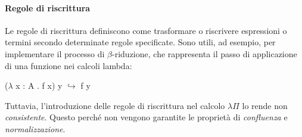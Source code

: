 \documentclass[12pt,a4paper]{mimosis}
\begin{document}
\begin{prooftree}
\end{prooftree}

\begin{prooftree}
\end{prooftree}

\begin{prooftree}
\end{prooftree}

\begin{prooftree}
\end{prooftree}

\begin{prooftree}
\end{prooftree}

\begin{prooftree}
\end{prooftree}


\begin{prooftree}
\end{prooftree}

\paragraph{Regole di riscrittura} \label{sottosezioneDedukti}
Le regole di riscrittura definiscono come trasformare o riscrivere espressioni
o termini secondo determinate regole specificate. Sono utili, ad esempio, per
implementare il processo di $\beta$-riduzione, che rappresenta il passo di 
applicazione di una funzione nei calcoli lambda:
\begin{center}
  ($\lambda$ x : A . f x) y $\hookrightarrow$ f y
\end{center}
Tuttavia, l'introduzione delle regole di riscrittura nel calcolo $\lambda\Pi$ 
lo rende non \textit{consistente}. Questo perché non vengono garantite le proprietà
di \textit{confluenza} e \textit{normalizzazione}.
\end{document}
